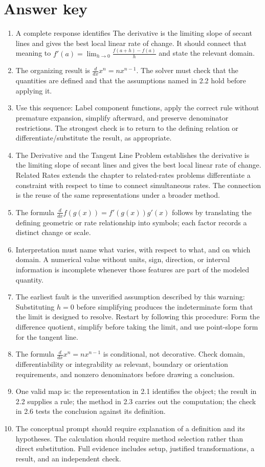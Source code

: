 \documentclass[11pt]{article}
\begin{document}
\section{Answer key}
\small
\begin{enumerate}
\item A complete response identifies The derivative is the limiting slope of secant lines and gives the best local linear rate of change. It should connect that meaning to \(f'(a)=\lim_{h\to0}\frac{f(a+h)-f(a)}{h}\) and state the relevant domain.
\item The organizing result is \(\frac{d}{dx}x^n=nx^{n-1}\). The solver must check that the quantities are defined and that the assumptions named in 2.2 hold before applying it.
\item Use this sequence: Label component functions, apply the correct rule without premature expansion, simplify afterward, and preserve denominator restrictions. The strongest check is to return to the defining relation or differentiate/substitute the result, as appropriate.
\item The Derivative and the Tangent Line Problem establishes the derivative is the limiting slope of secant lines and gives the best local linear rate of change. Related Rates extends the chapter to related-rates problems differentiate a constraint with respect to time to connect simultaneous rates. The connection is the reuse of the same representations under a broader method.
\item The formula \(\frac{d}{dx}f(g(x))=f'(g(x))g'(x)\) follows by translating the defining geometric or rate relationship into symbols; each factor records a distinct change or scale.
\item Interpretation must name what varies, with respect to what, and on which domain. A numerical value without units, sign, direction, or interval information is incomplete whenever those features are part of the modeled quantity.
\item The earliest fault is the unverified assumption described by this warning: Substituting $h=0$ before simplifying produces the indeterminate form that the limit is designed to resolve. Restart by following this procedure: Form the difference quotient, simplify before taking the limit, and use point-slope form for the tangent line.
\item The formula \(\frac{d}{dx}x^n=nx^{n-1}\) is conditional, not decorative. Check domain, differentiability or integrability as relevant, boundary or orientation requirements, and nonzero denominators before drawing a conclusion.
\item One valid map is: the representation in 2.1 identifies the object; the result in 2.2 supplies a rule; the method in 2.3 carries out the computation; the check in 2.6 tests the conclusion against its definition.
\item The conceptual prompt should require explanation of a definition and its hypotheses. The calculation should require method selection rather than direct substitution. Full evidence includes setup, justified transformations, a result, and an independent check.
\end{enumerate}
\normalsize
\end{document}
